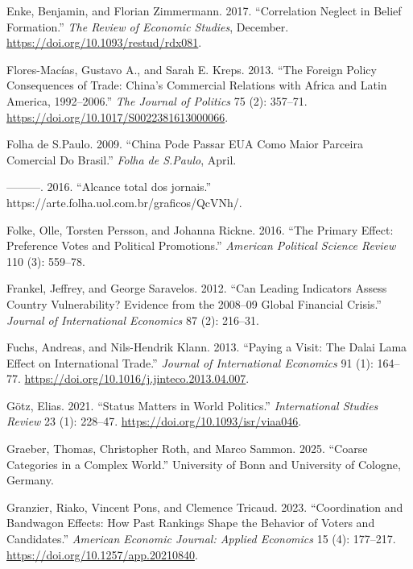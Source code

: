 \documentclass[
  12pt,
]{article}
\newlength{\cslhangindent}
\newenvironment{CSLReferences}[2] %
 {\begin{list}{}{%
  \setlength{\itemindent}{0pt}
  \setlength{\leftmargin}{0pt}
  \setlength{\parsep}{0pt}
  \ifodd #1
   \setlength{\leftmargin}{\cslhangindent}
   \setlength{\itemindent}{-1\cslhangindent}
  \fi
  \setlength{\itemsep}{#2\baselineskip}}}
 {\end{list}}
\begin{document}
\begin{CSLReferences}{1}{0}
Enke, Benjamin, and Florian Zimmermann. 2017. {``Correlation {Neglect}
in {Belief Formation}.''} \emph{The Review of Economic Studies},
December. \url{https://doi.org/10.1093/restud/rdx081}.

Flores-Macías, Gustavo A., and Sarah E. Kreps. 2013. {``The {Foreign
Policy Consequences} of {Trade}: {China}'s {Commercial Relations} with
{Africa} and {Latin America}, 1992--2006.''} \emph{The Journal of
Politics} 75 (2): 357--71.
\url{https://doi.org/10.1017/S0022381613000066}.

Folha de S.Paulo. 2009. {``China Pode Passar {EUA} Como Maior Parceira
Comercial Do {Brasil}.''} \emph{Folha de S.Paulo}, April.

---------. 2016. {``{Alcance total dos jornais}.''}
https://arte.folha.uol.com.br/graficos/QcVNh/.

Folke, Olle, Torsten Persson, and Johanna Rickne. 2016. {``The Primary
Effect: {Preference} Votes and Political Promotions.''} \emph{American
Political Science Review} 110 (3): 559--78.

Frankel, Jeffrey, and George Saravelos. 2012. {``Can Leading Indicators
Assess Country Vulnerability? {Evidence} from the 2008--09 Global
Financial Crisis.''} \emph{Journal of International Economics} 87 (2):
216--31.

Fuchs, Andreas, and Nils-Hendrik Klann. 2013. {``Paying a Visit: {The
Dalai Lama} Effect on International Trade.''} \emph{Journal of
International Economics} 91 (1): 164--77.
\url{https://doi.org/10.1016/j.jinteco.2013.04.007}.

Götz, Elias. 2021. {``Status {Matters} in {World Politics}.''}
\emph{International Studies Review} 23 (1): 228--47.
\url{https://doi.org/10.1093/isr/viaa046}.

Graeber, Thomas, Christopher Roth, and Marco Sammon. 2025. {``Coarse
Categories in a Complex World.''} {University of Bonn and University of
Cologne, Germany}.

Granzier, Riako, Vincent Pons, and Clemence Tricaud. 2023.
{``Coordination and {Bandwagon Effects}: {How Past Rankings Shape} the
{Behavior} of {Voters} and {Candidates}.''} \emph{American Economic
Journal: Applied Economics} 15 (4): 177--217.
\url{https://doi.org/10.1257/app.20210840}.


\end{CSLReferences}
\end{document}
